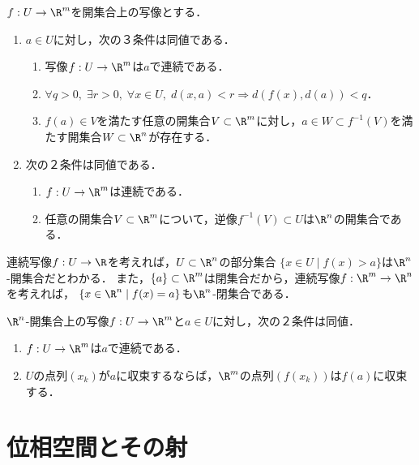 \documentclass[uplatex,dvipdfmx]{jsreport}
\begin{document}
\begin{proposition}[連続写像の特徴付け]\label{prop-characterization-of-continuous-map-in-metric-spaces}
    $f:U\to\R^m$を開集合上の写像とする．
    \begin{enumerate}
        \item $a\in U$に対し，次の３条件は同値である．
        \begin{enumerate}[(1)]
            \item 写像$f:U\to\R^m$は$a$で連続である．
            \item $\forall q>0,\;\exists r>0,\; \forall x\in U,\; d(x,a)<r\Rightarrow d(f(x),d(a))<q$．
            \item $f(a)\in V$を満たす任意の開集合$V\subset\R^m$に対し，$a\in W\subset f^{-1}(V)$を満たす開集合$W\subset\R^n$が存在する．
        \end{enumerate}
        \item  次の２条件は同値である．
        \begin{enumerate}[(1)]
            \item $f:U\to\R^m$は連続である．
            \item 任意の開集合$V\subset\R^m$について，逆像$f^{-1}(V)\subset U$は$\R^n$の開集合である．
        \end{enumerate}
    \end{enumerate}
\end{proposition}
\begin{remark}
    連続写像$f:U\to\R$を考えれば，$U\subset\R^n$の部分集合
    $\{x\in U\mid f(x)>a\}$は$\R^n$-開集合だとわかる．
    また，$\{a\}\subset\R^m$は閉集合だから，連続写像$f:\R^m\to\R^n$を考えれば，
    $\{x\in\R^n\mid f(x)=a\}$も$\R^n$-閉集合である．
\end{remark}

\begin{proposition}[連続写像の特徴付け]
    $\R^n$-開集合上の写像$f:U\to\R^m$と$a\in U$に対し，次の２条件は同値．
    \begin{enumerate}
        \item $f:U\to\R^m$は$a$で連続である．
        \item $U$の点列$(x_k)$が$a$に収束するならば，$\R^m$の点列$(f(x_k))$は$f(a)$に収束する．
    \end{enumerate}
\end{proposition}

\chapter{位相空間とその射}
\end{document}
